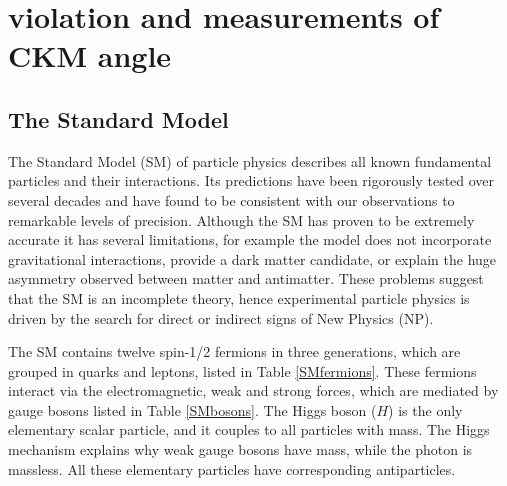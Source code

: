 %

\chapter{\label{ch:2-background}\CP violation and measurements of CKM angle \Pgamma} 

\minitoc

\section{The Standard Model}

The Standard Model (SM) of particle physics describes all known fundamental particles and their interactions. Its predictions have been rigorously tested over several decades and have found to be consistent with our observations to remarkable levels of precision. Although the SM has proven to be extremely accurate it has several limitations, for example the model does not incorporate gravitational interactions, provide a dark matter candidate, or explain the huge asymmetry observed between matter and antimatter. These problems suggest that the SM is an incomplete theory, hence experimental particle physics is driven by the search for direct or indirect signs of New Physics (NP).

The SM contains twelve spin-1/2 fermions in three generations, which are grouped in quarks and leptons, listed in Table \ref{SMfermions}. These fermions interact via the electromagnetic, weak and strong forces, which are mediated by gauge bosons listed in Table \ref{SMbosons}. The Higgs boson ($H$) is the only elementary scalar particle, and it couples to all particles with mass. The Higgs mechanism explains why weak gauge bosons have mass, while the photon is massless. All these elementary particles have corresponding antiparticles. 

